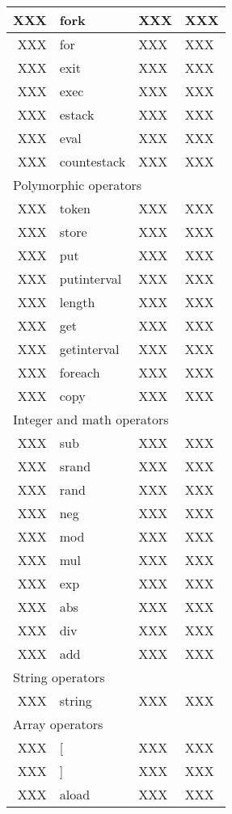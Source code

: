 \begin{longtable}{|r|l|l|p{4in}|}
XXX & fork & XXX & XXX \\
\hline
XXX & for & XXX & XXX \\
\hline
XXX & exit & XXX & XXX \\
\hline
XXX & exec & XXX & XXX \\
\hline
XXX & estack & XXX & XXX \\
\hline
XXX & eval & XXX & XXX \\
\hline
XXX & countestack & XXX & XXX \\
\hline \hline
\multicolumn{4}{|l|}{Polymorphic operators} \\
\hline \hline
XXX & token & XXX & XXX \\
\hline
XXX & store & XXX & XXX \\
\hline
XXX & put & XXX & XXX \\
\hline
XXX & putinterval & XXX & XXX \\
\hline
XXX & length & XXX & XXX \\
\hline
XXX & get & XXX & XXX \\
\hline
XXX & getinterval & XXX & XXX \\
\hline
XXX & foreach & XXX & XXX \\
\hline
XXX & copy & XXX & XXX \\
\hline \hline
\multicolumn{4}{|l|}{Integer and math operators} \\
\hline \hline
XXX & sub & XXX & XXX \\
\hline
XXX & srand & XXX & XXX \\
\hline
XXX & rand & XXX & XXX \\
\hline
XXX & neg & XXX & XXX \\
\hline
XXX & mod & XXX & XXX \\
\hline
XXX & mul & XXX & XXX \\
\hline
XXX & exp & XXX & XXX \\
\hline
XXX & abs & XXX & XXX \\
\hline
XXX & div & XXX & XXX \\
\hline
XXX & add & XXX & XXX \\
\hline \hline
\multicolumn{4}{|l|}{String operators} \\
\hline \hline
XXX & string & XXX & XXX \\
\hline \hline
\multicolumn{4}{|l|}{Array operators} \\
\hline \hline
XXX & [ & XXX & XXX \\
\hline
XXX & ] & XXX & XXX \\
\hline
XXX & aload & XXX & XXX \\

\end{longtable}
